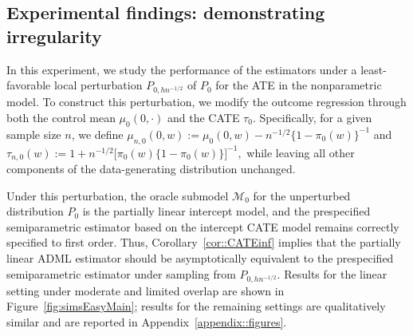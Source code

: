 \documentclass[11pt]{article}
\theoremstyle{definition}
\begin{document}
\subsection{Experimental findings: demonstrating irregularity}

In this experiment, we study the performance of the estimators under a least-favorable local perturbation \(P_{0,h n^{-1/2}}\) of \(P_0\) for the ATE in the nonparametric model. To construct this perturbation, we modify the outcome regression through both the control mean \(\mu_0(0,\cdot)\) and the CATE \(\tau_0\). Specifically, for a given sample size \(n\), we define $\mu_{n,0}(0,w) := \mu_0(0,w) - n^{-1/2}\{1-\pi_0(w)\}^{-1}$
and $\tau_{n,0}(w) := 1 + n^{-1/2}\bigl[\pi_0(w)\{1-\pi_0(w)\}\bigr]^{-1},$
while leaving all other components of the data-generating distribution unchanged.

Under this perturbation, the oracle submodel \(\mathcal{M}_0\) for the unperturbed distribution \(P_0\) is the partially linear intercept model, and the prespecified semiparametric estimator based on the intercept CATE model remains correctly specified to first order. Thus, Corollary~\ref{cor::CATEinf} implies that the partially linear ADML estimator should be asymptotically equivalent to the prespecified semiparametric estimator under sampling from \(P_{0,h n^{-1/2}}\). Results for the linear setting under moderate and limited overlap are shown in Figure~\ref{fig:simsEasyMain}; results for the remaining settings are qualitatively similar and are reported in Appendix~\ref{appendix::figures}.
\end{document}
